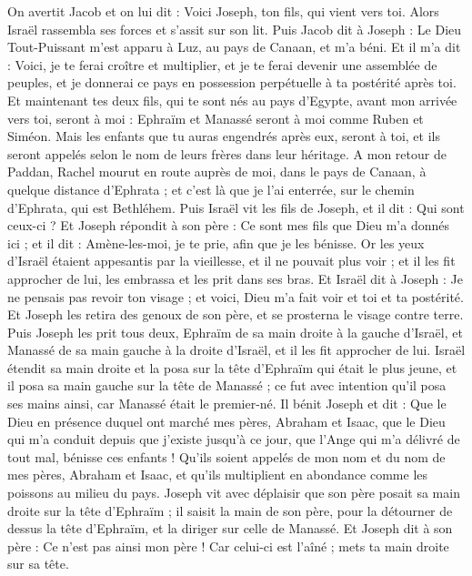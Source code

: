\begin{multicols}{2}
On avertit Jacob et on lui dit : Voici Joseph, ton fils, qui vient vers toi. Alors Israël rassembla ses forces et s’assit sur son lit.
Puis Jacob dit à Joseph : Le Dieu Tout-Puissant m’est apparu  à Luz, au pays de Canaan, et m’a béni.
Et il m’a dit : Voici, je te ferai croître et multiplier, et je te ferai devenir une assemblée de peuples, et je donnerai ce pays en possession perpétuelle à ta postérité après toi.
Et maintenant tes deux fils, qui te sont nés au pays d'Egypte, avant mon arrivée vers toi, seront à moi : Ephraïm et Manassé seront à moi comme Ruben et Siméon.
Mais les enfants que tu auras engendrés après eux, seront à toi, et ils seront appelés selon le nom de leurs frères dans leur héritage.
A mon retour de Paddan, Rachel mourut en route auprès de moi, dans le pays de Canaan, à quelque distance d’Ephrata ; et c’est là que je l’ai enterrée, sur le chemin d’Ephrata, qui est Bethléhem.
Puis Israël vit les fils de Joseph, et il dit : Qui sont ceux-ci ?
Et Joseph répondit à son père : Ce sont mes fils que Dieu m'a donnés ici ; et il dit : Amène-les-moi, je te prie, afin que je les bénisse.
Or les yeux d'Israël étaient appesantis par la vieillesse, et il ne pouvait plus voir ; et il les fit approcher de lui, les embrassa et les prit dans ses bras.
Et Israël dit à Joseph : Je ne pensais pas revoir ton visage ; et voici, Dieu m'a fait voir et toi et ta postérité.
Et Joseph les retira des genoux de son père, et se prosterna le visage contre terre.
Puis Joseph les prit tous deux, Ephraïm de sa main droite à la gauche d’Israël, et Manassé de sa main gauche à la droite d’Israël, et il les fit approcher de lui.
Israël étendit sa main droite et la posa sur la tête d’Ephraïm qui était le plus jeune, et il posa sa main gauche sur la tête de Manassé ; ce fut avec intention qu’il posa ses mains ainsi, car Manassé était le premier-né.
Il bénit Joseph et dit : Que le Dieu en présence duquel ont marché mes pères, Abraham et Isaac, que le Dieu qui m’a conduit depuis que j’existe jusqu’à ce jour,
que l’Ange qui m’a délivré de tout mal, bénisse ces enfants ! Qu’ils soient appelés de mon nom et du nom de mes pères, Abraham et Isaac, et qu’ils multiplient en abondance comme les poissons au milieu du pays.
Joseph vit avec déplaisir que son père posait sa main droite sur la tête d’Ephraïm ; il saisit la main de son père, pour la détourner de dessus la tête d’Ephraïm, et la diriger sur celle de Manassé.
Et Joseph dit à son père : Ce n'est pas ainsi mon père ! Car celui-ci est l'aîné ; mets ta main droite sur sa tête.

\end{multicols}
